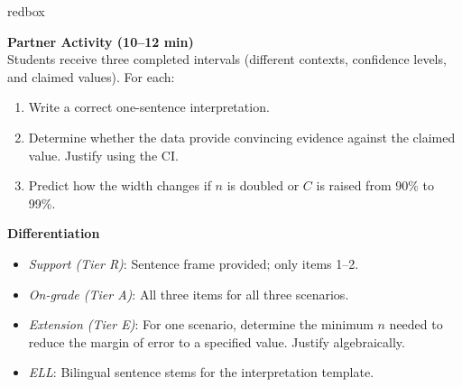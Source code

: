\documentclass[10pt]{article}
\begin{document}
\begin{skillbox}{redbox}
\begin{minipage}[t]{0.48\linewidth}
    \textbf{Partner Activity (10--12 min)}\\
    Students receive three completed intervals (different contexts, confidence
    levels, and claimed values). For each:
    \begin{enumerate}
        \item Write a correct one-sentence interpretation.
        \item Determine whether the data provide convincing evidence against the
              claimed value. Justify using the CI.
        \item Predict how the width changes if $n$ is doubled or $C$ is raised
              from 90\% to 99\%.
    \end{enumerate}
\end{minipage}
\hfill
\begin{minipage}[t]{0.48\linewidth}
    \textbf{Differentiation}
    \begin{itemize}
        \item \textit{Support (Tier R)}: Sentence frame provided; only items 1--2.
        \item \textit{On-grade (Tier A)}: All three items for all three scenarios.
        \item \textit{Extension (Tier E)}: For one scenario, determine the minimum
              $n$ needed to reduce the margin of error to a specified value. Justify
              algebraically.
        \item \textit{ELL}: Bilingual sentence stems for the interpretation template.
    \end{itemize}
\end{minipage}
\end{skillbox}
\end{document}
